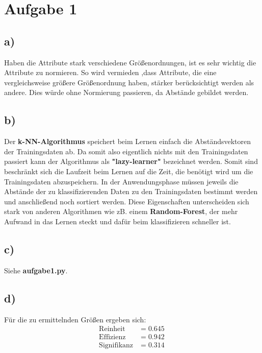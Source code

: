 \section{Aufgabe 1}
\label{sec:a1}

\subsection{a)}
\label{subsec:a1a}
Haben die Attribute stark verschiedene Größenordnungen,
ist es sehr wichtig die Attribute zu normieren. So wird vermieden
,dass Attribute, die eine vergleichsweise größere Größenordnung
haben, stärker berücksichtigt werden als andere. Dies würde
ohne Normierung passieren, da Abstände gebildet werden.

\subsection{b)}
\label{subsec:a1b}
Der \textbf{k-NN-Algorithmus} speichert beim Lernen
einfach die Abständsvektoren der Trainingsdaten ab. Da
somit also eigentlich nichts mit den Trainingsdaten passiert
kann der Algorithmus als \textbf{"lazy-learner"} bezeichnet
werden. Somit sind beschränkt sich die Laufzeit beim Lernen auf
die Zeit, die benötigt wird um die Trainingsdaten abzuspeichern.
In der Anwendungsphase müssen jeweils die Abstände der
zu klassifizierenden Daten zu den Trainingsdaten bestimmt
werden und anschließend noch sortiert werden.
Diese Eigenschaften unterscheiden sich stark von anderen
Algorithmen wie zB. einem \textbf{Random-Forest}, der
mehr Aufwand in das Lernen steckt und dafür beim klassifizieren
schneller ist.


\subsection{c)}
\label{subsec:a1c}
Siehe \textbf{aufgabe1.py}.

\subsection{d)}
Für die zu ermittelnden Größen ergeben sich:
\\
\begin{align*}
  \text{Reinheit} &= \SI{0.645}{}\\
  \text{Effizienz} &= \SI{0.942}{}\\
  \text{Signifikanz} &= \SI{0.314}{}\\
\end{align*}

